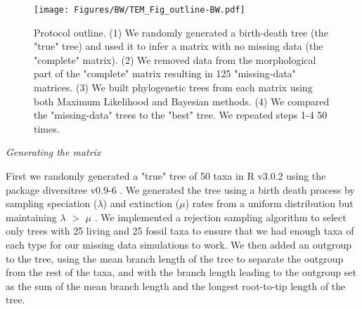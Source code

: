 \documentclass[12pt,letterpaper]{article}
\renewcommand{\subsection}[1]{%
\bigskip
\begin{center}
\begin{large}
\normalfont\itshape #1
\end{large}
\end{center}}
\begin{document}
\begin{figure}
\centering
    \texttt{[image: Figures/BW/TEM\_Fig\_outline-BW.pdf]}
\caption{Protocol outline.
(1) We randomly generated a birth-death tree (the "true" tree) and used it to infer a matrix with no missing data (the "complete" matrix).
(2) We removed data from the morphological part of the "complete" matrix resulting in 125 "missing-data" matrices.
(3) We built phylogenetic trees from each matrix using both Maximum Likelihood and Bayesian methods.
(4) We compared the "missing-data" trees to the "best" tree.
We repeated steps 1-4 50 times.}
\label{Fig_Outline}
\end{figure}




\subsection{Generating the matrix}
First we randomly generated a "true" tree of 50 taxa in R v3.0.2 \citep{R302} using the package diversitree v0.9-6 \citep{fitzjohndiversitree2012}. We generated the tree using a birth death process by sampling speciation ($\lambda$) and extinction ($\mu$) rates from a uniform distribution but maintaining $\lambda$ $>$ $\mu$ \citep{paradistime-dependent2011}. We implemented a rejection sampling algorithm to select only trees with 25 living and 25 fossil taxa to ensure that we had enough taxa of each type for our missing data simulations to work. We then added an outgroup to the tree, using the mean branch length of the tree to separate the outgroup from the rest of the taxa, and with the branch length leading to the outgroup set as the sum of the mean branch length and the longest root-to-tip length of the tree.
\end{document}
